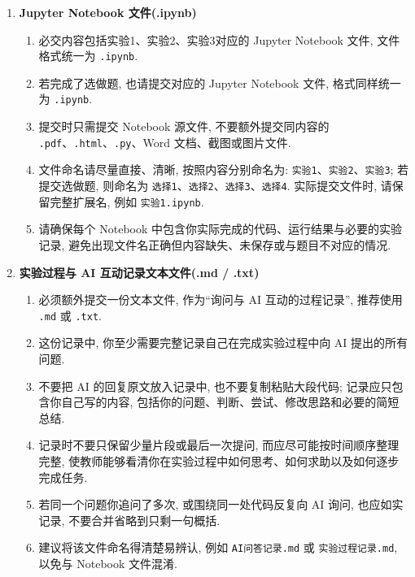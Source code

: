 \documentclass{../../nndlcourse}
\begin{document}
\begin{enumerate}
    \item \textbf{Jupyter Notebook 文件(.ipynb)}
    \begin{enumerate}
        \item 必交内容包括实验1、实验2、实验3对应的 Jupyter Notebook 文件, 文件格式统一为 \texttt{.ipynb}.
        \item 若完成了选做题, 也请提交对应的 Jupyter Notebook 文件, 格式同样统一为 \texttt{.ipynb}.
        \item 提交时只需提交 Notebook 源文件, 不要额外提交同内容的 \texttt{.pdf}、\texttt{.html}、\texttt{.py}、Word 文档、截图或图片文件.
        \item 文件命名请尽量直接、清晰, 按照内容分别命名为: \texttt{实验1}、\texttt{实验2}、\texttt{实验3}; 若提交选做题, 则命名为 \texttt{选择1}、\texttt{选择2}、\texttt{选择3}、\texttt{选择4}. 实际提交文件时, 请保留完整扩展名, 例如 \texttt{实验1.ipynb}.
        \item 请确保每个 Notebook 中包含你实际完成的代码、运行结果与必要的实验记录, 避免出现文件名正确但内容缺失、未保存或与题目不对应的情况.
    \end{enumerate}
    \item \textbf{实验过程与 AI 互动记录文本文件(.md / .txt)}
    \begin{enumerate}
        \item 必须额外提交一份文本文件, 作为``询问与 AI 互动的过程记录'', 推荐使用 \texttt{.md} 或 \texttt{.txt}.
        \item 这份记录中, 你至少需要完整记录自己在完成实验过程中向 AI 提出的所有问题.
        \item 不要把 AI 的回复原文放入记录中, 也不要复制粘贴大段代码; 记录应只包含你自己写的内容, 包括你的问题、判断、尝试、修改思路和必要的简短总结.
        \item 记录时不要只保留少量片段或最后一次提问, 而应尽可能按时间顺序整理完整, 使教师能够看清你在实验过程中如何思考、如何求助以及如何逐步完成任务.
        \item 若同一个问题你追问了多次, 或围绕同一处代码反复向 AI 询问, 也应如实记录, 不要合并省略到只剩一句概括.
        \item 建议将该文件命名得清楚易辨认, 例如 \texttt{AI问答记录.md} 或 \texttt{实验过程记录.md}, 以免与 Notebook 文件混淆.
    \end{enumerate}
\end{enumerate}



\end{document}
